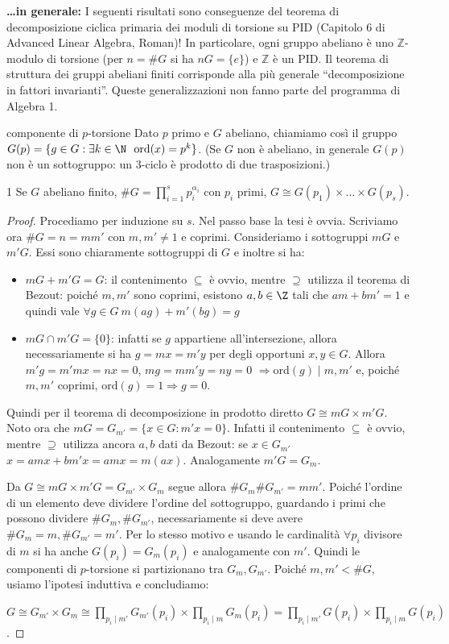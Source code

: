 \textbf{\ldots in generale:} I seguenti risultati sono conseguenze del teorema di decomposizione ciclica primaria dei moduli di torsione su PID (Capitolo 6 di Advanced Linear Algebra, Roman)! In particolare, ogni gruppo abeliano è uno $\mathbb{Z}$-modulo di torsione (per $n = \#G$ si ha $n G = \{e\}$) e $\mathbb{Z}$ è un PID. Il teorema di struttura dei gruppi abeliani finiti corrisponde alla più generale ``decomposizione in fattori invarianti''. Queste generalizzazioni non fanno parte del programma di Algebra 1.

\begin{definition}{componente di $p$-torsione}
    Dato $p$ primo e $G$ abeliano, chiamiamo così il gruppo $G(p) = \{g \in G : \exists k \in \N\ \ \text{ord}(x) = p^k\}$. (Se $G$ non è abeliano, in generale $G(p)$ non è un sottogruppo: un $3$-ciclo è prodotto di due trasposizioni.)
\end{definition}
\begin{theorem}{1}
    Se $G$ abeliano finito, $\#G = \prod_{i = 1}^s p_i^{\alpha_i}$ con $p_i$ primi,  $G \cong G(p_1) \times \dots \times G(p_s)$.
\end{theorem}
\begin{proof}
    Procediamo per induzione su $s$. Nel passo base la tesi è ovvia. Scriviamo ora $\#G = n = mm'$ con $m,m' \neq 1$ e coprimi. Consideriamo i sottogruppi $mG$ e $m'G$. Essi sono chiaramente sottogruppi di $G$ e inoltre si ha:
    \begin{itemize}
        \item $mG + m'G = G$: il contenimento $\subseteq$ è ovvio, mentre $\supseteq$ utilizza il teorema di Bezout: poiché $m,m'$ sono coprimi, esistono $a,b\in \Z$ tali che $am +bm' = 1$ e quindi vale $\forall g \in G \ m(ag) + m'(bg) = g$
        \item $mG \cap m'G = \{0\}$: infatti se $g$ appartiene all'intersezione, allora necessariamente si ha $g = mx = m'y$ per degli opportuni $x,y \in G$. Allora $m'g = m'mx = nx = 0$, $mg = mm'y = ny = 0$ $\Rightarrow \text{ord}(g) \mid m,m'$ e, poiché $m,m'$ coprimi, $\text{ord}(g) = 1 \Rightarrow g = 0$.
    \end{itemize}
    Quindi per il teorema di decomposizione in prodotto diretto $G \cong mG \times m'G$. Noto ora che $mG = G_{m'} = \{x \in G : m'x = 0\}$. Infatti il contenimento $\subseteq$ è ovvio, mentre $\supseteq$ utilizza ancora $a,b$ dati da Bezout: se $x \in G_{m'}$ $x = amx + bm'x = amx = m(ax)$. Analogamente $m'G = G_m$.
    
    Da $G \cong mG \times m'G = G_{m'} \times G_m$ segue allora $\#G_m \#G_{m'} = mm'$. Poiché l'ordine di un elemento deve dividere l'ordine del sottogruppo, guardando i primi che possono dividere $\#G_m, \#G_{m'}$, necessariamente si deve avere $\#G_m=m, \#G_{m'}=m'$. Per lo stesso motivo e usando le cardinalità $\forall p_i$ divisore di $m$ si ha anche $G(p_i) = G_m(p_i)$ e analogamente con $m'$. Quindi le componenti di $p$-torsione si partizionano tra $G_m, G_{m'}$. Poiché $m,m' < \#G$, usiamo l'ipotesi induttiva e concludiamo:
    
    $G \cong G_{m'}\times G_m \cong \prod_{p_i \mid m'} G_{m'}(p_i) \times \prod_{p_i \mid m} G_{m}(p_i) = \prod_{p_i \mid m'} G(p_i) \times \prod_{p_i \mid m} G(p_i)$.
\end{proof}
